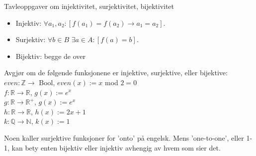 \begin{frame}{Tavleoppgaver om injektivitet, surjektivitet, bijektivitet}
    \begin{itemize}
        \item Injektiv:  $\forall a_1, a_2 : [f(a_1) = f(a_2) \rightarrow a_1 = a_2]$.\\
        \item Surjektiv: $\forall b \in B$  $\exists a \in A : [f(a) = b]$.\\
        \item Bijektiv: begge de over \\
    \end{itemize}
    \pause
    \begin{block}{Avgjør om de følgende funksjonene er injektive, surjektive, eller bijektive:}
        $even : \mathbb{Z} \rightarrow $ Bool, $even(x) := x$ mod $2 = 0$\\
        $f : \mathbb{R} \rightarrow \mathbb{R}$, $g(x) := e^x$\\
        $g : \mathbb{R} \rightarrow \mathbb{R}^+$, $g(x) := e^x$\\
        $h : \mathbb{R} \rightarrow \mathbb{R}$, $h(x) := 2x + 1$\\
        $k : \mathbb{Q} \rightarrow \mathbb{N}$, $k(x) := 1$\\
    \end{block}
    \pause
    Noen kaller surjektive funksjoner for 'onto' på engelsk. Mens 'one-to-one', eller 1-1, kan bety enten bijektiv eller injektiv avhengig av hvem som sier det.
\end{frame}